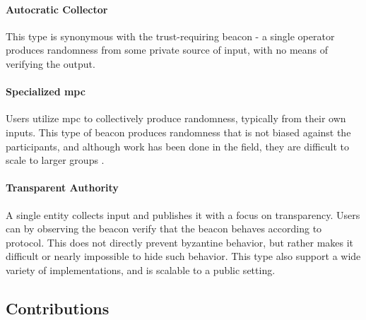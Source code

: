 \paragraph{Autocratic Collector} This type is synonymous with the trust-requiring beacon - a single operator produces randomness from some private source of input, with no means of verifying the output.

\paragraph{Specialized \acrshort{mpc}} Users utilize \acrfull{mpc} to collectively produce randomness, typically from their own inputs. This type of beacon produces randomness that is not biased against the participants, and although work has been done in the field, they are difficult to scale to larger groups \cite{cascudo2017scrape, syta2017scalable}.

\paragraph{Transparent Authority} A single entity collects input and publishes it with a focus on transparency. Users can by observing the beacon verify that the beacon behaves according to protocol. This does not directly prevent byzantine behavior, but rather makes it difficult or nearly impossible to hide such behavior. This type also support a wide variety of implementations, and is scalable to a public setting.

\subsection{Contributions}
